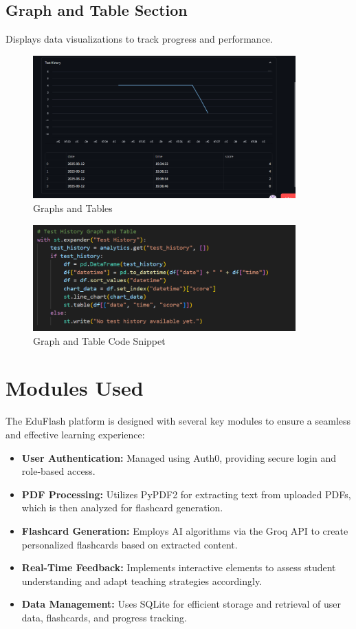 \documentclass{report}
\begin{document}
\subsection{Graph and Table Section}
Displays data visualizations to track progress and performance.
\begin{figure}[H]
\centering
\includegraphics[width=0.9\textwidth]{graph-table.png}
\caption{Graphs and Tables}
\end{figure}
\begin{figure}[H]
\centering
\includegraphics[width=0.9\textwidth]{graph-table-code.png}
\caption{Graph and Table Code Snippet}
\end{figure}
\clearpage
\FloatBarrier %

\section{Modules Used}
The EduFlash platform is designed with several key modules to ensure a seamless and effective learning experience:
\begin{itemize}
    \item \textbf{User Authentication:} Managed using Auth0, providing secure login and role-based access.
    \item \textbf{PDF Processing:} Utilizes PyPDF2 for extracting text from uploaded PDFs, which is then analyzed for flashcard generation.
    \item \textbf{Flashcard Generation:} Employs AI algorithms via the Groq API to create personalized flashcards based on extracted content.
    \item \textbf{Real-Time Feedback:} Implements interactive elements to assess student understanding and adapt teaching strategies accordingly.
    \item \textbf{Data Management:} Uses SQLite for efficient storage and retrieval of user data, flashcards, and progress tracking.
\end{itemize}
\end{document}
